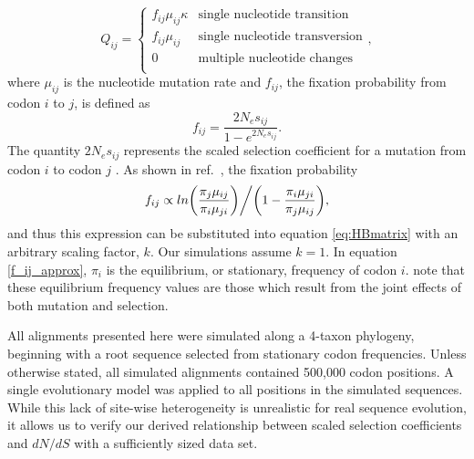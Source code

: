 \documentclass{pnastwo}
\begin{document}
\begin{article}
		\begin{equation}\label{eq:HBmatrix}
			Q_{ij} = \left\{ 
			\begin{array}{rl}
				f_{ij}\mu_{ij}\kappa               &\mbox{single nucleotide transition} \\
				f_{ij}\mu_{ij}                          &\mbox{single nucleotide transversion} \\
				0                                           &\mbox{multiple nucleotide changes} \\             
			\end{array} \right.,
		\end{equation} where $\mu_{ij}$ is the nucleotide mutation rate and $f_{ij}$, the fixation probability from codon $i$ to $j$, is defined as 
		\begin{equation}\label{f_ij_approx} f_{ij} = \frac{2N_es_{ij}}{1 - e^{2N_es_{ij}}}. \end{equation} The quantity $2N_es_{ij}$ represents the scaled selection coefficient for a mutation from codon $i$ to codon $j$ \cite{HalpernBruno1998, YangNielsen2008}. As shown in ref.\ \cite{HalpernBruno1998}, the fixation probability \begin{equation}f_{ij} \propto ln\bigg{(}\frac{\pi_j\mu_{ij}}{\pi_i\mu_{ji}}\bigg{)}\bigg{/}\bigg{(}1 - \frac{\pi_i\mu_{ji}}{\pi_j\mu_{ij}}\bigg{)},\end{equation} and thus this expression can be substituted into equation \eqref{eq:HBmatrix} with an arbitrary scaling factor, $k$. Our simulations assume $k=1$. In equation \eqref{f_ij_approx}, $\pi_i$ is the equilibrium, or stationary, frequency of codon $i$. note that these equilibrium frequency values are those which result from the joint effects of both mutation and selection. 
		
		
		All alignments presented here were simulated along a 4-taxon phylogeny, beginning with a root sequence selected from stationary codon frequencies. Unless otherwise stated, all simulated alignments contained 500,000 codon positions. A single evolutionary model was applied to all positions in the simulated sequences. While this lack of site-wise heterogeneity is unrealistic for real sequence evolution, it allows us to verify our derived relationship between scaled selection coefficients and $dN/dS$ with a sufficiently sized data set.
		

\end{article}
\end{document}
